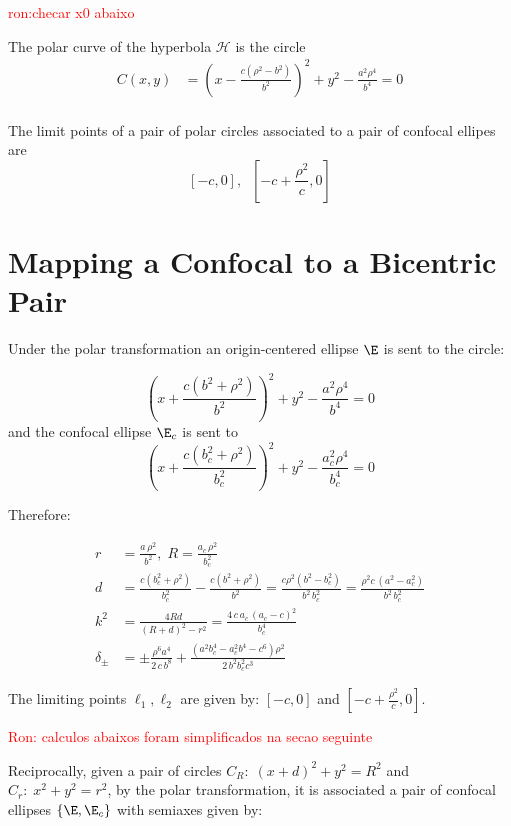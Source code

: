 \textcolor{red}{ron:checar x0 abaixo}
\begin{lemma}
The polar curve of the hyperbola $\mathcal{H}$ is the circle
\begin{align*}
   C(x,y)&= \left(x- \frac{c(\rho^2 - b^2)}{b^2} \right)^2+y^2-\frac{a^2\rho^4}{b^4}=0\\
\end{align*}  
\end{lemma}

\begin{lemma}
The limit points of a pair of polar circles associated to a pair of confocal ellipes are
\[ \left[-c,0\right], \;\; \left[-c+\frac{\rho^2}{c} ,0\right]\]

\end{lemma}
\section{Mapping a Confocal to a Bicentric Pair}
Under the polar transformation an origin-centered ellipse $\E$ is sent to the circle:

\[ \left( x+{\frac {c \left( {b}^{2}+\rho^{2} \right) }{{b}^{2}}}
 \right) ^{2}+{y}^{2}-{\frac {{a}^{2}\rho^{4}}{{b}^4}}=0\]
 and the confocal ellipse $\E_c$ is sent to
 \[ \left( x+\frac {c \left( b_c^{2}+\rho^{2} \right) }{b_c^2}
 \right) ^{2}+{y}^{2}-{\frac {a_c^{2}\rho^{4}}{b_c^4}}=0\]
 
Therefore:

\begin{align*} r&=\frac{a \,\rho^2}{b^2},\; R=\frac{a_c\, \rho^2}{b_c^2}\\
d&=\frac {c \left( b_c^{2}+\rho^{2} \right) }{b_c^2}-\frac {c \left( b^{2}+\rho^{2} \right) }{b^2}=\frac{c \rho^2(b^2 - b_c^2)}{b^2\, b_c^2}=\frac{\rho^2 c\, (a^2 - a_c^2)}{b^2\, b_c^2}\\
  k^2&=\frac{4Rd}{(R+d)^2-r^2}=\frac{4 \,c\, a_c\,(a_c - c)^2    }{b_c^4}\\
  \delta_{\pm}&=\pm {\frac {\rho^{6}{a}^{4}}{2\,c\, {b}^{8}}}+{\frac { \left( {a}^{2} b_c^{4}-a_c^{2}{b}^{4}-{c}^{6} \right) \rho^{2}}{2\,{b}^{2}  b_c^{2} {c}^{3}}}
\end{align*}

 The limiting points $\ell_1,\ell_2$ are given by: $[-c,0]$ and $[-c+\frac{\rho^2}{c},0]$.
 
 
 \textcolor{red}{Ron: calculos abaixos foram simplificados na secao seguinte}
 
 
 Reciprocally, given a pair of circles $C_R:\; (x+d)^2+y^2=R^2$ and $C_r:\; x^2+y^2=r^2$, by the  polar transformation, 
 it is associated a pair of confocal ellipses $\{\E, \E_c\}$
 with semiaxes given by:
 
